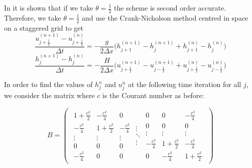 \documentclass[a4paper, 10.5pt, notitlepage]{article}
\begin{document}
In \cite{implicit} it is shown that if we take $\theta = \frac{1}{2}$ the scheme is second order accurate. Therefore, we take $\theta = \frac{1}{2}$ and use the Crank-Nicholson method centred in space on a staggered grid to get
\begin{equation}\label{semiimplicit1}
\frac{u_{j + \frac{1}{2}}^{(n + 1)} - u_{j + \frac{1}{2}}^{(n)}}{\Delta t} = -\frac{g}{2\Delta x} \bigg(h_{j + 1}^{(n+ 1)} - h_{j}^{(n+ 1)} + h_{j + 1}^{(n)} - h_{j}^{(n)}\bigg)
\end{equation}
\begin{equation}\label{semiimplicit2}
\frac{h_{j}^{(n + 1)} - h_{j}^{(n)}}{\Delta t} = -\frac{H}{2\Delta x} \bigg(u_{j + \frac{1}{2}}^{(n+ 1)} - u_{j - \frac{1}{2}}^{(n+ 1)} + u_{j + \frac{1}{2}}^{(n)} - u_{j - \frac{1}{2}}^{(n)}\bigg)
\end{equation}

In order to find the values of $h_{j}^{n}$ and $u_{j}^{n}$ at the following time iteration for all $j$, we consider the matrix where $c$ is the Courant number as before:

\[
B = \left (
\begin{array}{ccc}
\begin{array}{ccc}
1 + \frac{c^{2}}{2} & -\frac{c^{2}}{4} & 0\\
-\frac{c^{2}}{4}& 1 + \frac{c^{2}}{2} & -\frac{c^{2}}{4} \\
\vdots & \vdots & \vdots\\
0 & 0  & 0 \\
- \frac{c^{2}}{4}  & 0  & 0 
\end{array}
\begin{array}{c}
\vdots\\ 
\ddots\\
\vdots
\end{array}
\begin{array}{ccc}
0  & 0  &  - \frac{c^{2}}{4}\\
0  & 0& 0\\
\vdots & \vdots & \vdots\\
-\frac{c^{2}}{4}& 1 + \frac{c^{2}}{2} & -\frac{c^{2}}{4} \\
0 & -\frac{c^{2}}{4} & 1 + \frac{c^{2}}{2}
\end{array}
\end{array}
\right )
\]
\end{document}
